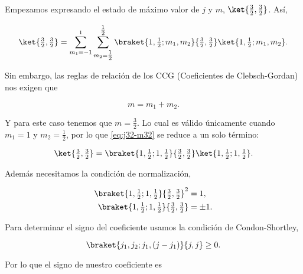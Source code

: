 \documentclass[./../main.tex]{subfiles}
\begin{document}
\begin{exercise}
\begin{enumerate}[label=(\alph*)]
\begin{solution}
                Empezamos expresando el estado de máximo valor de \(j\) y \(m\), \(\ket{\frac{3}{2},\frac{3}{2}}\). Así,

                \begin{equation}
                    \ket{\tfrac{3}{2}, \tfrac{3}{2}} = \sum_{m_{1} = -1}^{1}\sum_{m_{2} = \tfrac{1}{2}}^{\tfrac{1}{2}}\braket{1, \tfrac{1}{2}; m_{1}, m_{2}}{\tfrac{3}{2}, \tfrac{3}{2}}\ket{1, \tfrac{1}{2}; m_{1}, m_{2}}.
                    \label{eq:j32-m32}
                \end{equation}

                Sin embargo, las reglas de relación de los CCG (Coeficientes de Clebsch-Gordan) nos exigen que

                \begin{equation*}
                    m = m_{1} + m_{2}.
                \end{equation*}

                Y para este caso tenemos que \(m = \frac{3}{2}\). Lo cual es válido únicamente cuando \(m_{1} = 1\) y \(m_{2} = \frac{1}{2}\), por lo que \cref{eq:j32-m32} se reduce a un solo término:

                \begin{equation*}
                    \ket{\tfrac{3}{2}, \tfrac{3}{2}} = \braket{1, \tfrac{1}{2}; 1, \tfrac{1}{2}}{\tfrac{3}{2}, \tfrac{3}{2}}\ket{1, \tfrac{1}{2}; 1, \tfrac{1}{2}}.
                \end{equation*}

                Además necesitamos la condición de normalización,

                \begin{align*}
                    \braket{1, \tfrac{1}{2}; 1, \tfrac{1}{2}}{\tfrac{3}{2}, \tfrac{3}{2}}^{2} &= 1,\\
                    \braket{1, \tfrac{1}{2}; 1, \tfrac{1}{2}}{\tfrac{3}{2}, \tfrac{3}{2}} &= \pm 1.
                \end{align*}

                Para determinar el signo del coeficiente usamos la condición de Condon-Shortley,

                \begin{equation*}
                    \braket{j_{1}, j_{2}; j_{1}, (j - j_{1})}{j, j} \geq 0.
                \end{equation*}

                Por lo que el signo de nuestro coeficiente es


\end{solution}
\end{enumerate}
\end{exercise}
\end{document}
